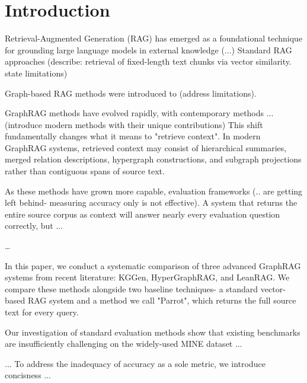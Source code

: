 \section{Introduction}

Retrieval-Augmented Generation (RAG) has emerged as a foundational technique for grounding large language models in external knowledge (...)
Standard RAG approaches (describe: retrieval of fixed-length text chunks via vector similarity. state limitations)

Graph-based RAG methods were introduced to (address limitations).

GraphRAG methods have evolved rapidly, with contemporary methods ... (introduce modern methods with their unique contributions)
This shift fundamentally changes what it means to "retrieve context". In modern GraphRAG systems, retrieved context may consist of hierarchical summaries, merged relation descriptions, hypergraph constructions, and subgraph projections rather than
contiguous spans of source text.

As these methods have grown more capable, evaluation frameworks (.. are getting left behind- measuring accuracy only is not effective). A system that returns the entire source corpus as context will answer nearly every evaluation question correctly, 
but ... 

\dots

In this paper, we conduct a systematic comparison of three advanced GraphRAG systems from recent literature: KGGen, HyperGraphRAG, and LeanRAG. We compare these methods alongside two baseline techniques- a standard vector-based RAG system and a
method we call "Parrot", which returns the full source text for every query.

Our investigation of standard evaluation methods show that existing benchmarks are insufficiently challenging on the widely-used MINE dataset ...

... To address the inadequacy of accuracy as a sole metric, we introduce concisness ... 

